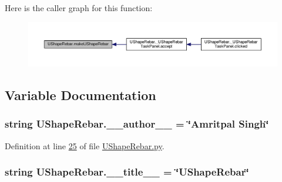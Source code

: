 Here is the caller graph for this function\+:\nopagebreak
\begin{figure}[H]
\begin{center}
\leavevmode
\includegraphics[width=350pt]{namespaceUShapeRebar_adb9f6e4b9ec41d7a1fdfe58ad174fec3_icgraph}
\end{center}
\end{figure}




\subsection{Variable Documentation}
\subsubsection[{\texorpdfstring{\+\_\+\+\_\+author\+\_\+\+\_\+}{__author__}}]{\setlength{\rightskip}{0pt plus 5cm}string U\+Shape\+Rebar.\+\_\+\+\_\+author\+\_\+\+\_\+ = \char`\"{}Amritpal Singh\char`\"{}\hspace{0.3cm}{\ttfamily [private]}}\hypertarget{namespaceUShapeRebar_a97e2ec9c8f01fe19bd22095b5aef9c29}{}\label{namespaceUShapeRebar_a97e2ec9c8f01fe19bd22095b5aef9c29}


Definition at line \hyperlink{UShapeRebar_8py_source_l00025}{25} of file \hyperlink{UShapeRebar_8py_source}{U\+Shape\+Rebar.\+py}.

\subsubsection[{\texorpdfstring{\+\_\+\+\_\+title\+\_\+\+\_\+}{__title__}}]{\setlength{\rightskip}{0pt plus 5cm}string U\+Shape\+Rebar.\+\_\+\+\_\+title\+\_\+\+\_\+ = \char`\"{}U\+Shape\+Rebar\char`\"{}\hspace{0.3cm}{\ttfamily [private]}}\hypertarget{namespaceUShapeRebar_ada77465e981ba03265231173a2645e0b}{}\label{namespaceUShapeRebar_ada77465e981ba03265231173a2645e0b}


